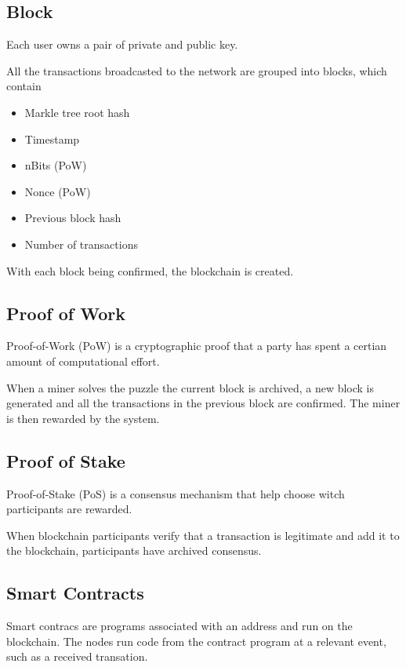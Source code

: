 \documentclass[../documentation.tex]{subfiles}
\begin{document}
\subsection{Block}

Each user owns a pair of private and public key.

All the transactions broadcasted to the network are grouped into blocks, which contain

\begin{itemize}
    \item Markle tree root hash
    \item Timestamp
    \item nBits (PoW)
    \item Nonce (PoW)
    \item Previous block hash
    \item Number of transactions
\end{itemize}

With each block being confirmed, the blockchain is created.

\subsection{Proof of Work}

Proof-of-Work (PoW) is a cryptographic proof that a party has spent
a certian amount of computational effort.

When a miner solves the puzzle the current block is archived, a new
block is generated and all the transactions in the previous block are confirmed.
The miner is then rewarded by the system.

\subsection{Proof of Stake}

Proof-of-Stake (PoS) is a consensus mechanism that help choose witch participants
are rewarded.

When blockchain participants verify that a transaction is legitimate and add it
to the blockchain, participants have archived consensus.

\subsection{Smart Contracts}

Smart contracs are programs associated with an address and run on the blockchain.
The nodes run code from the contract program at a relevant event, such as a received transation.
\end{document}
